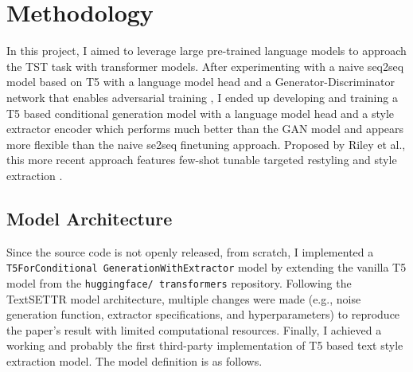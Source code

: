 \documentclass[a4paper]{article}
\begin{document}
\section{Methodology}

In this project, I aimed to leverage large pre-trained language models to approach the
TST task with transformer models. After experimenting with a naive seq2seq model
based on T5 \cite[][]{raffel_exploring_2020} with a language model head and a Generator-Discriminator network that
enables adversarial training \cite[implementing][]{dai_style_2019}, I ended up
developing and training a T5 based conditional generation model with a language model
head and a style extractor encoder which performs much better than the GAN model and appears
more flexible than the naive se2seq finetuning approach. Proposed by Riley et al., this more
recent approach features few-shot tunable targeted restyling and style extraction \cite[]{riley_textsettr_2021}.

\subsection{Model Architecture}

Since the source code is not openly released, from scratch, I implemented a
\texttt{T5ForConditional GenerationWithExtractor} model by extending the vanilla
T5 model from the \texttt{huggingface/ transformers} repository. Following the
TextSETTR model architecture, multiple changes were made (e.g., noise generation
function, extractor specifications, and hyperparameters) to reproduce the paper's
result with limited computational resources. Finally, I achieved a working and
probably the first third-party implementation of T5 based text style extraction model.
The model definition is as follows.
\end{document}

